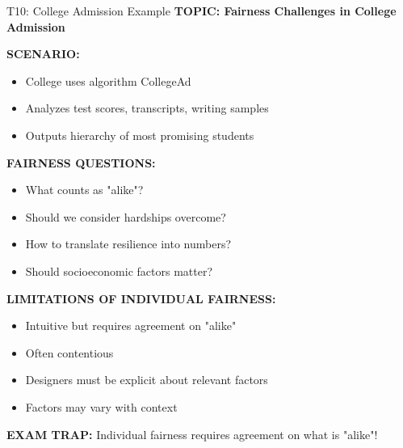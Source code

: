 \documentclass[8pt]{beamer}
\begin{document}
	\begin{frame}{T10: College Admission Example}
		\fontsize{6.5}{7.5}\selectfont
		\textbf{TOPIC: Fairness Challenges in College Admission}
		
		\vspace{0.1cm}
		\textbf{SCENARIO:}
		\begin{itemize}
			\item College uses algorithm CollegeAd
			\item Analyzes test scores, transcripts, writing samples
			\item Outputs hierarchy of most promising students
		\end{itemize}
		
		\vspace{0.1cm}
		\textbf{FAIRNESS QUESTIONS:}
		\begin{itemize}
			\item What counts as "alike"?
			\item Should we consider hardships overcome?
			\item How to translate resilience into numbers?
			\item Should socioeconomic factors matter?
		\end{itemize}
		
		\vspace{0.1cm}
		\textbf{LIMITATIONS OF INDIVIDUAL FAIRNESS:}
		\begin{itemize}
			\item Intuitive but requires agreement on "alike"
			\item Often contentious
			\item Designers must be explicit about relevant factors
			\item Factors may vary with context
		\end{itemize}
		
		\textcolor{myred}{\textbf{EXAM TRAP:}} Individual fairness requires \textcolor{myblue}{agreement on what is "alike"}!
	\end{frame}
	
\end{document}
